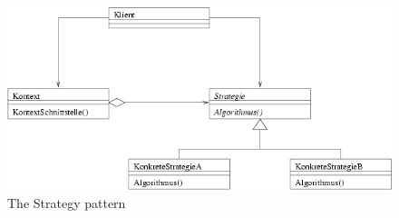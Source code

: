\documentclass[../main/main.tex]{subfiles}
\begin{document}
\begin{figure}
  \includegraphics{../figures/strategypattern.png}  
  \caption{The Strategy pattern}
  \label{fig:strategy}
\end{figure}
\end{document}
